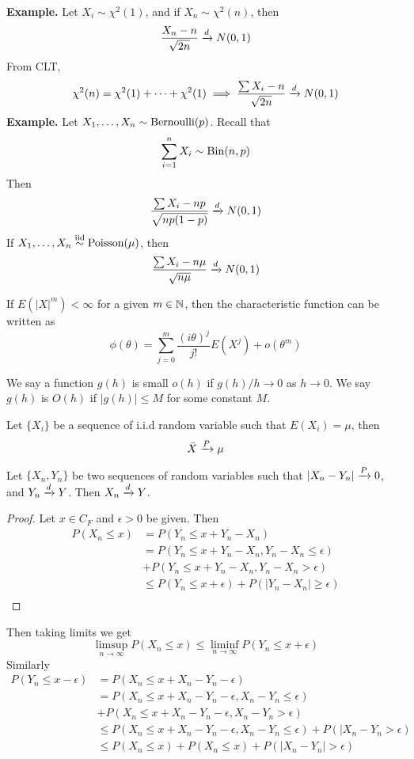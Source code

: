 \textbf{Example.} Let $X_i \sim \chi^2(1)$, and if $X_n \sim \chi^2(n)$, then 
\[\frac{X_n - n}{\sqrt{2n}} \xrightarrow{d} N(0,1)\]
From CLT, 
\[\chi^2(n) = \chi^2(1) + \cdots + \chi^2(1) \implies \frac{\sum X_i - n}{\sqrt{2n}} \xrightarrow{d} N(0,1)\]
\textbf{Example.} Let $X_1, \ldots, X_n \sim \operatorname{Bernoulli}(p)$. Recall that 
\[\sum_{i=1}^n X_i \sim \operatorname{Bin}(n,p)\]
Then 
\[\frac{\sum X_i - np }{\sqrt{np(1-p)}} \xrightarrow{d} N(0,1)\]
If $X_1, \ldots, X_n \overset{\mathrm{iid}}{\sim} \operatorname{Poisson}(\mu)$, then 
\[\frac{\sum X_i - n\mu}{\sqrt{n\mu}} \xrightarrow{d} N(0,1)\]
\begin{theorem}
    If $E(|X|^m) < \infty$ for a given $m \in \mathbb{N}$, then the characteristic function can be written as
    \[\phi(\theta) = \sum_{j=0}^m \frac{(i\theta)^j}{j!} E(X^j) + o(\theta^m)\] 
\end{theorem}
We say a function $g(h)$ is small $o(h)$ if $g(h)/h \rightarrow 0$ as $h\rightarrow 0$. We say $g(h)$ is $O(h)$ if $|g(h)| \leq M$ for some constant $M$. 
\begin{theorem}
    Let $\{X_i\}$ be a sequence of i.i.d random variable such that $E(X_i) = \mu$, then 
    \[\bar{X} \xrightarrow{P} \mu\]
\end{theorem}
\begin{theorem}
    Let $\{X_n, Y_n\}$ be two sequences of random variables such that $|X_n - Y_n| \xrightarrow{P} 0$, and $Y_n \xrightarrow{d} Y$. Then $X_n \xrightarrow{d} Y$.
\end{theorem}
\begin{proof}
    Let $x \in C_F$ and $\epsilon > 0$ be given. Then 
    \begin{align*}
        P(X_n \leq x) &= P(Y_n \leq x + Y_n - X_n)\\
        &= P(Y_n \leq x + Y_n - X_n, Y_n - X_n \leq \epsilon)\\
        &+ P(Y_n \leq x + Y_n - X_n, Y_n - X_n > \epsilon)\\
        &\leq P(Y_n \leq x + \epsilon) + P(|Y_n - X_n| \geq \epsilon)\\
    \end{align*}
\end{proof}
Then taking limits we get 
\[\limsup_{n\rightarrow\infty} P(X_n \leq x) \leq \liminf_{n\rightarrow\infty}P(Y_n \leq x + \epsilon)\]
Similarly 
\begin{align*}
    P(Y_n \leq x- \epsilon) &= P(X_n \leq x + X_n - Y_n - \epsilon)\\
    &= P(X_n \leq x + X_n - Y_n - \epsilon, X_n - Y_n \leq \epsilon)\\
    &+ P(X_n \leq x + X_n - Y_n - \epsilon, X_n - Y_n > \epsilon)\\
    &\leq P(X_n \leq x + X_n - Y_n - \epsilon, X_n - Y_n \leq \epsilon) + P(|X_n - Y_n > \epsilon)\\
    &\leq P(X_n\leq x) + P(X_n \leq x) + P(|X_n - Y_n| > \epsilon)
\end{align*}
